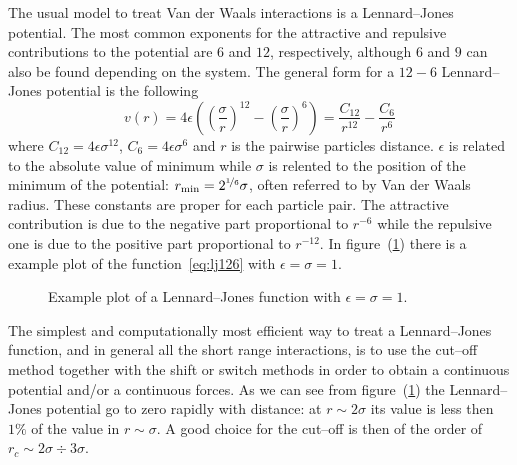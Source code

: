 The usual model to treat Van der Waals interactions is a Lennard--Jones potential. The most common exponents for the attractive and repulsive contributions to the potential are $6$ and $12$, respectively, although $6$ and $9$ can also be found depending on the system. The general form for a $12-6$ Lennard--Jones potential is the following
\begin{equation}
	v(r) = 4\epsilon\left ( \left ( \frac{\sigma}{r}\right )^{12}  - \left ( \frac{\sigma}{r} \right )^6 \right ) = \frac{C_{12}}{r^{12}} - \frac{C_{6}}{r^{6}}
	\label{eq:lj126}
\end{equation}
where $C_{12} = 4\epsilon\sigma^{12}$, $C_{6} = 4\epsilon\sigma^{6}$ and $r$ is the pairwise particles distance. $\epsilon$ is related to the absolute value of minimum while $\sigma$ is relented to the position of the minimum of the potential: $r_{\text{min}} = 2^{\nicefrac{1}{6}}\sigma$, often referred to by Van der Waals radius. These constants are proper for each particle pair. The attractive contribution is due to the negative part proportional to $r^{-6}$ while the repulsive one is due to the positive part proportional to $r^{-12}$. In figure~(\ref{fig:LG12511}) there is a example plot of the function~\eqref{eq:lj126} with $\epsilon = \sigma = 1$.
\begin{figure}[!ht]
\centering
	\caption{Example plot of a Lennard--Jones function with $\epsilon = \sigma = 1$.}
	\label{fig:LG12511}
\end{figure}

The simplest and computationally most efficient way to treat a Lennard--Jones function, and in general all the short range interactions, is to use the cut--off method together with the shift or switch methods in order to obtain a continuous potential and/or a continuous forces. As we can see from figure~(\ref{fig:LG12511}) the Lennard--Jones potential go to zero rapidly with distance: at $r \sim 2\sigma$ its value is less then $1\%$ of the value in $r \sim \sigma$. A good choice for the cut--off is then of the order of $r_c \sim 2\sigma \div 3\sigma$.

